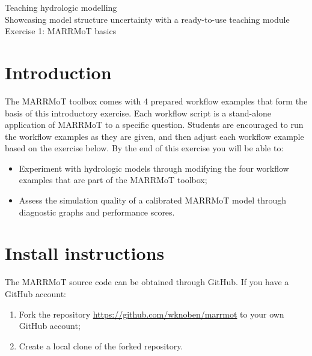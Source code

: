 \documentclass[12pt]{article}
\begin{document}

\begin{center}
Teaching hydrologic modelling\\
Showcasing model structure uncertainty with a ready-to-use teaching module \\
\vspace*{3mm}
Exercise 1: MARRMoT basics\\
\end{center}

\bigskip


\section{Introduction}

The MARRMoT toolbox comes with 4 prepared workflow examples that form the basis of this introductory exercise. Each workflow script is a stand-alone application of MARRMoT to a specific question. Students are encouraged to run the workflow examples as they are given, and then adjust each workflow example based on the exercise below. By the end of this exercise you will be able to:

\begin{itemize}
    \item Experiment with hydrologic models through modifying the four workflow examples that are part of the MARRMoT toolbox;
    \item Assess the simulation quality of a calibrated MARRMoT model through diagnostic graphs and performance scores.
\end{itemize}



\section{Install instructions}

The MARRMoT source code can be obtained through GitHub. If you have a GitHub account:

\begin{enumerate}
	\item Fork the repository \url{https://github.com/wknoben/marrmot} to your own GitHub account;
	\item Create a local clone of the forked repository.
\end{enumerate}
\end{document}
